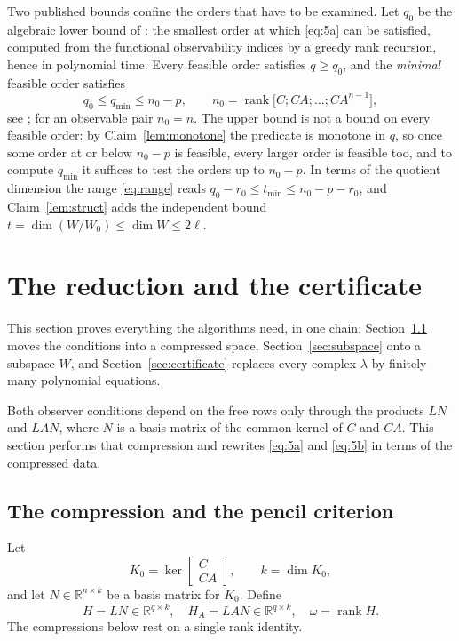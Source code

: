 \documentclass[journal]{IEEEtran}
\theoremstyle{plainn}
\theoremstyle{remark}
\begin{document}
Two published bounds confine the orders that have to be examined. Let $q_0$ be the algebraic
lower bound of \cite{fer26a,fer26b}: the smallest order at which \eqref{eq:5a} can be satisfied,
computed from the functional observability indices by a greedy rank recursion, hence in polynomial
time. Every feasible order satisfies $q\ge q_0$, and the \emph{minimal} feasible order satisfies
\begin{equation}\label{eq:range}
q_0\le q_{\min}\le n_0-p,\qquad n_0=\operatorname{rank}\bigl[C;CA;\dots;CA^{n-1}\bigr],
\end{equation}
see \cite{fer26a,fer26b}; for an observable pair $n_0=n$. The upper bound is not a bound on every
feasible order: by Claim~\ref{lem:monotone} the predicate is monotone in $q$, so once some order at
or below $n_0-p$ is feasible, every larger order is feasible too, and to compute $q_{\min}$ it
suffices to test the orders up to $n_0-p$. In terms of the quotient dimension the range
\eqref{eq:range} reads $q_0-r_0\le t_{\min}\le n_0-p-r_0$, and Claim~\ref{lem:struct} adds the
independent bound $t=\dim(W/W_0)\le\dim W\le2\ell$.

\section{The reduction and the certificate}\label{sec:reduction}\label{sec:compressed}\label{sec:dimension}

This section proves everything the algorithms need, in one chain: Section~\ref{sec:compression} moves the conditions into a compressed space, Section~\ref{sec:subspace} onto a subspace $W$, and Section~\ref{sec:certificate} replaces every complex $\lambda$ by finitely many polynomial equations.

Both observer conditions depend on the free rows only through the products $LN$ and $LAN$, where $N$ is a basis matrix of the common kernel of $C$ and $CA$. This section performs that compression and rewrites \eqref{eq:5a} and \eqref{eq:5b} in terms of the compressed data.

\subsection{The compression and the pencil criterion}\label{sec:compression}\label{sec:compress}

Let
\begin{equation*}
K_0=\ker\begin{bmatrix}C\\ CA\end{bmatrix},\qquad k=\dim K_0,
\end{equation*}
and let $N\in\mathbb R^{n\times k}$ be a basis matrix for $K_0$. Define
\begin{equation*}
H=LN\in\mathbb R^{q\times k},\quad H_A=LAN\in\mathbb R^{q\times k},\quad \omega=\operatorname{rank}H .
\end{equation*}
The compressions below rest on a single rank identity.
\end{document}
